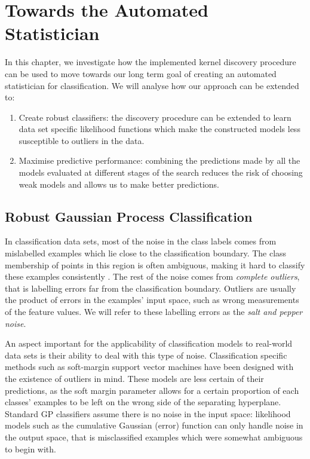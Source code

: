 \documentclass[a4paper,12pt ]{report}
\begin{document}
\cleardoublepage

\chapter{Towards the Automated Statistician}

In this chapter, we investigate how the implemented kernel discovery procedure can be used to move towards our long term goal of creating an automated statistician for classification. We will analyse how our approach can be extended to:

\begin{enumerate}

\item {Create robust classifiers:} the discovery procedure can be extended to learn data set specific likelihood functions which make the constructed models less susceptible to outliers in the data.

\item {Maximise predictive performance:} combining the predictions made by all the models evaluated at different stages of the search reduces the risk of choosing weak models and allows us to make better predictions.

\end{enumerate}

\section{Robust Gaussian Process Classification}

In classification data sets, most of the noise in the class labels comes from mislabelled examples which lie close to the classification boundary. The class membership of points in this region is often ambiguous, making it hard to classify these examples consistently \cite{kim08}. The rest of the noise comes from \emph{complete outliers}, that is labelling errors far from the classification boundary. Outliers are usually the product of errors in the examples' input space, such as wrong measurements of the feature values. We will refer to these labelling errors as the \emph{salt and pepper noise}.

An aspect important for the applicability of classification models to real-world data sets is their ability to deal with this type of noise. Classification specific methods such as soft-margin support vector machines have been designed with the existence of outliers in mind. These models are less certain of their predictions, as the soft margin parameter allows for a certain proportion of each classes' examples to be left on the wrong side of the separating hyperplane. Standard GP classifiers assume there is no noise in the input space: likelihood models such as the cumulative Gaussian (error) function can only handle noise in the output space, that is misclassified examples which were somewhat ambiguous to begin with.
\end{document}
